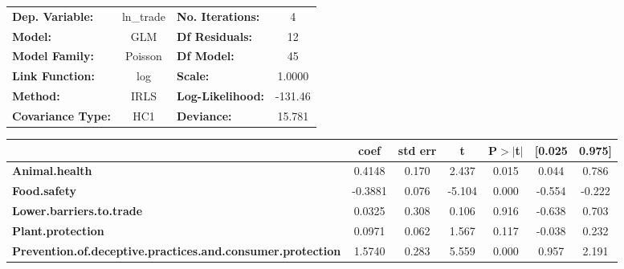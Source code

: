 \begin{center}
\begin{tabular}{lclc}
\toprule
\textbf{Dep. Variable:}                                            &   ln\_trade   & \textbf{  No. Iterations:    } &     4       \\
\textbf{Model:}                                                    &      GLM      & \textbf{  Df Residuals:      } &     12      \\
\textbf{Model Family:}                                             &    Poisson    & \textbf{  Df Model:          } &     45      \\
\textbf{Link Function:}                                            &      log      & \textbf{  Scale:             } &    1.0000   \\
\textbf{Method:}                                                   &      IRLS     & \textbf{  Log-Likelihood:    } &   -131.46   \\
\textbf{Covariance Type:}                                          &      HC1      & \textbf{  Deviance:          } &    15.781   \\
\bottomrule
\end{tabular}
\begin{tabular}{lcccccc}
                                                                   & \textbf{coef} & \textbf{std err} & \textbf{t} & \textbf{P$> |$t$|$} & \textbf{[0.025} & \textbf{0.975]}  \\
\midrule
\textbf{Animal.health}                                             &       0.4148  &        0.170     &     2.437  &         0.015        &        0.044    &        0.786     \\
\textbf{Food.safety}                                               &      -0.3881  &        0.076     &    -5.104  &         0.000        &       -0.554    &       -0.222     \\
\textbf{Lower.barriers.to.trade}                                   &       0.0325  &        0.308     &     0.106  &         0.916        &       -0.638    &        0.703     \\
\textbf{Plant.protection}                                          &       0.0971  &        0.062     &     1.567  &         0.117        &       -0.038    &        0.232     \\
\textbf{Prevention.of.deceptive.practices.and.consumer.protection} &       1.5740  &        0.283     &     5.559  &         0.000        &        0.957    &        2.191     \\

\end{tabular}
\end{center}
